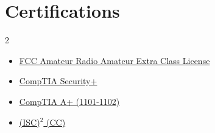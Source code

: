 \section{Certifications}

\begin{multicols}{2}
\begin{itemize}[noitemsep]
        \item \href{https://wireless2.fcc.gov/UlsApp/UlsSearch/license.jsp?licKey=4970498}{FCC Amateur Radio Amateur Extra Class License}
        \item \href{https://www.credly.com/badges/ba212fd6-4840-4395-a672-7df371342fe6}{CompTIA Security+}
        \item \href{https://www.credly.com/badges/d9c44e5d-ef50-48aa-8a2b-46f793609745}{CompTIA A+ (1101-1102)}
        \item \href{https://www.credly.com/badges/98fa5101-a798-47da-9d26-477f38dbcb9d}{(ISC)$^2$ (CC)}
\end{itemize}
\end{multicols}
